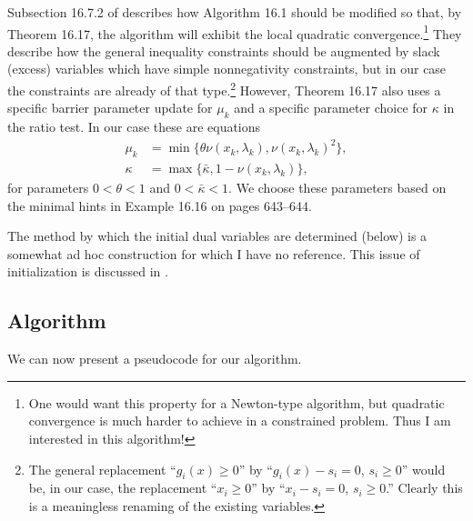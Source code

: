 \documentclass[11pt]{article}
\begin{document}
Subsection 16.7.2 of \cite{GrivaNashSofer2009} describes how Algorithm 16.1 should be modified so that, by Theorem 16.17, the algorithm will exhibit the local quadratic convergence.\footnote{One would want this property for a Newton-type algorithm, but quadratic convergence is much harder to achieve in a constrained problem.  Thus I am interested in this algorithm!}  They describe how the general inequality constraints should be augmented by slack (excess) variables which have simple nonnegativity constraints, but in our case the constraints are already of that type.\footnote{The general replacement ``$g_i(x)\ge 0$'' by ``$g_i(x) - s_i =0$, $s_i\ge 0$'' would be, in our case, the replacement ``$x_i\ge 0$'' by ``$x_i-s_i=0$, $s_i\ge 0$.''  Clearly this is a meaningless renaming of the existing variables.}  However, Theorem 16.17 also uses a specific barrier parameter update for $\mu_k$ and a specific parameter choice for $\kappa$ in the ratio test.  In our case these are equations
\begin{align*}
\mu_k &= \min\{\theta \nu(x_k,\lambda_k),\nu(x_k,\lambda_k)^2\}, \\
\kappa &= \max\{\bar\kappa,1-\nu(x_k,\lambda_k)\},
\end{align*}
for parameters $0<\theta<1$ and $0<\bar\kappa<1$.  We choose these parameters based on the minimal hints in Example 16.16 on pages 643--644.

The method by which the initial dual variables are determined (below) is a somewhat ad hoc construction for which I have no reference.  This issue of initialization is discussed in \cite{Gertzetal2004}.


\subsection*{Algorithm}

We can now present a pseudocode for our algorithm.
\end{document}
